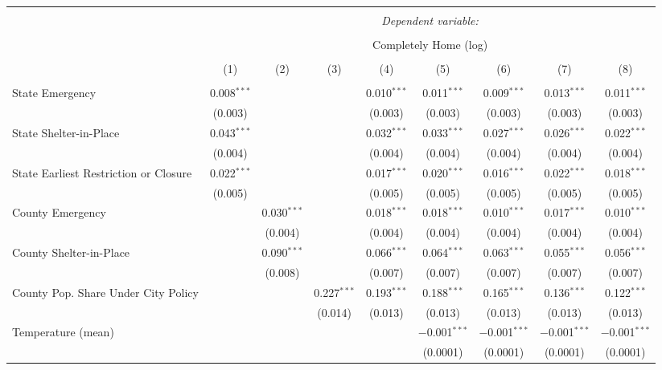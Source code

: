 
\begin{tabular}{@{\extracolsep{5pt}}lcccccccc} 
\\[-1.8ex]\hline 
\hline \\[-1.8ex] 
 & \multicolumn{8}{c}{\textit{Dependent variable:}} \\ 
\cline{2-9} 
\\[-1.8ex] & \multicolumn{8}{c}{Completely Home (log)} \\ 
\\[-1.8ex] & (1) & (2) & (3) & (4) & (5) & (6) & (7) & (8)\\ 
\hline \\[-1.8ex] 
 State Emergency & 0.008$^{***}$ &  &  & 0.010$^{***}$ & 0.011$^{***}$ & 0.009$^{***}$ & 0.013$^{***}$ & 0.011$^{***}$ \\ 
  & (0.003) &  &  & (0.003) & (0.003) & (0.003) & (0.003) & (0.003) \\ 
  State Shelter-in-Place & 0.043$^{***}$ &  &  & 0.032$^{***}$ & 0.033$^{***}$ & 0.027$^{***}$ & 0.026$^{***}$ & 0.022$^{***}$ \\ 
  & (0.004) &  &  & (0.004) & (0.004) & (0.004) & (0.004) & (0.004) \\ 
  State Earliest Restriction or Closure & 0.022$^{***}$ &  &  & 0.017$^{***}$ & 0.020$^{***}$ & 0.016$^{***}$ & 0.022$^{***}$ & 0.018$^{***}$ \\ 
  & (0.005) &  &  & (0.005) & (0.005) & (0.005) & (0.005) & (0.005) \\ 
  County Emergency &  & 0.030$^{***}$ &  & 0.018$^{***}$ & 0.018$^{***}$ & 0.010$^{***}$ & 0.017$^{***}$ & 0.010$^{***}$ \\ 
  &  & (0.004) &  & (0.004) & (0.004) & (0.004) & (0.004) & (0.004) \\ 
  County Shelter-in-Place &  & 0.090$^{***}$ &  & 0.066$^{***}$ & 0.064$^{***}$ & 0.063$^{***}$ & 0.055$^{***}$ & 0.056$^{***}$ \\ 
  &  & (0.008) &  & (0.007) & (0.007) & (0.007) & (0.007) & (0.007) \\ 
  County Pop. Share Under City Policy &  &  & 0.227$^{***}$ & 0.193$^{***}$ & 0.188$^{***}$ & 0.165$^{***}$ & 0.136$^{***}$ & 0.122$^{***}$ \\ 
  &  &  & (0.014) & (0.013) & (0.013) & (0.013) & (0.013) & (0.013) \\ 
  Temperature (mean) &  &  &  &  & $-$0.001$^{***}$ & $-$0.001$^{***}$ & $-$0.001$^{***}$ & $-$0.001$^{***}$ \\ 
  &  &  &  &  & (0.0001) & (0.0001) & (0.0001) & (0.0001) \\ 

\end{tabular}
